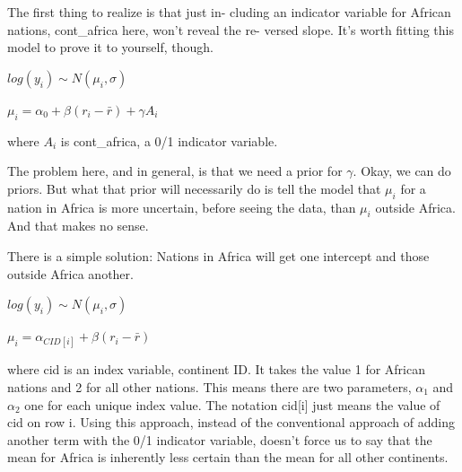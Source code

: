 \documentclass[
]{article}
\newenvironment{Shaded}{\begin{snugshade}}{\end{snugshade}}
\newcommand{\CommentTok}[1]{\textcolor[rgb]{0.56,0.35,0.01}{\textit{#1}}}
\newcommand{\DataTypeTok}[1]{\textcolor[rgb]{0.13,0.29,0.53}{#1}}
\newcommand{\DecValTok}[1]{\textcolor[rgb]{0.00,0.00,0.81}{#1}}
\newcommand{\FloatTok}[1]{\textcolor[rgb]{0.00,0.00,0.81}{#1}}
\newcommand{\KeywordTok}[1]{\textcolor[rgb]{0.13,0.29,0.53}{\textbf{#1}}}
\newcommand{\NormalTok}[1]{#1}
\newcommand{\OperatorTok}[1]{\textcolor[rgb]{0.81,0.36,0.00}{\textbf{#1}}}
\newcommand{\StringTok}[1]{\textcolor[rgb]{0.31,0.60,0.02}{#1}}
\begin{document}
The first thing to realize is that just in- cluding an indicator
variable for African nations, cont\_africa here, won't reveal the re-
versed slope. It's worth fitting this model to prove it to yourself,
though.

\(log(y_i) \sim N(\mu_i, \sigma)\)

\(\mu_i = \alpha_0 + \beta (r_i - \bar{r}) + \gamma A_i\)

where \(A_i\) is cont\_africa, a 0/1 indicator variable.

The problem here, and in general, is that we need a prior for
\(\gamma\). Okay, we can do priors. But what that prior will necessarily
do is tell the model that \(\mu_i\) for a nation in Africa is more
uncertain, before seeing the data, than \(\mu_i\) outside Africa. And
that makes no sense.

There is a simple solution: Nations in Africa will get one intercept and
those outside Africa another.

\(log(y_i) \sim N(\mu_i, \sigma)\)

\(\mu_i = \alpha_{CID[i]} + \beta (r_i - \bar{r})\)

where cid is an index variable, continent ID. It takes the value 1 for
African nations and 2 for all other nations. This means there are two
parameters, \(\alpha_{1}\) and \(\alpha_{2}\) one for each unique index
value. The notation cid{[}i{]} just means the value of cid on row i.
Using this approach, instead of the conventional approach of adding
another term with the 0/1 indicator variable, doesn't force us to say
that the mean for Africa is inherently less certain than the mean for
all other continents.

\begin{Shaded}
\end{Shaded}
\end{document}
